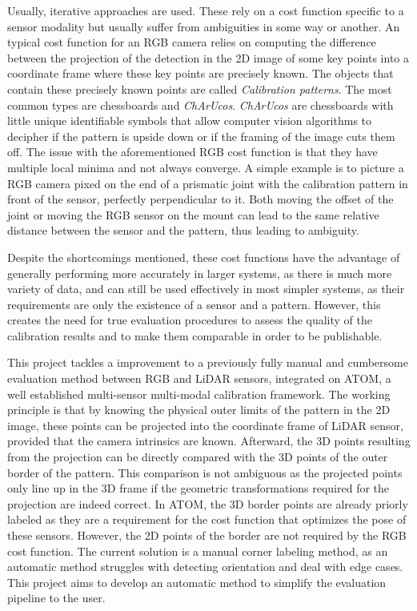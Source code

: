 \documentclass{ieeeaccess}
\begin{document}
Usually, iterative approaches are used. These rely on a cost function specific to a sensor modality but usually suffer from ambiguities
in some way or another. An typical cost function for an RGB camera relies on computing the difference between the projection of the
detection in the 2D image of some key points into a coordinate frame where these key points are precisely known. The objects that
contain these precisely known points are called \textit{Calibration patterns}. The most common types are chessboards and \textit{ChArUcos}.
\textit{ChArUcos} are chessboards with little unique identifiable symbols that allow computer vision algorithms to decipher if the
pattern is upside down or if the framing of the image cuts them off. The issue with the aforementioned RGB cost function is that they
have multiple local minima and not always converge. A simple example is to picture a RGB camera pixed on the end of a prismatic joint
with the calibration pattern in front of the sensor, perfectly perpendicular to it. Both moving the offset of the joint or
moving the RGB sensor on the mount can lead to the same relative distance between the sensor and the pattern, thus leading to
ambiguity. 

Despite the shortcomings mentioned, these cost functions have the advantage of generally performing more accurately in larger systems,
as there is much more variety of data, and can still be used effectively in most simpler systems, as their requirements are only the
existence of a sensor and a pattern. However, this creates the need for true evaluation procedures to assess the quality of the
calibration results and to make them comparable in order to be publishable. 

This project tackles a improvement to a previously fully manual and cumbersome evaluation method between RGB and LiDAR sensors,
integrated on ATOM, a well established multi-sensor multi-modal calibration framework. The working principle is that by knowing the
physical outer limits of the pattern in the 2D image, these points can be projected into the coordinate frame of LiDAR sensor, provided
that the camera intrinsics are known. Afterward, the 3D points resulting from the projection can be directly compared with the 3D
points of the outer border of the pattern. This comparison is not ambiguous as the projected points only line up in the 3D frame if the
geometric transformations required for the projection are indeed correct. In ATOM, the 3D border points are already priorly labeled as
they are a requirement for the cost function that optimizes the pose of these sensors. However, the 2D points of the border are not
required by the RGB cost function. The current solution is a manual corner labeling method, as an automatic method struggles
with detecting orientation and deal with edge cases. This project aims to develop an automatic method to simplify the evaluation
pipeline to the user.
\end{document}
